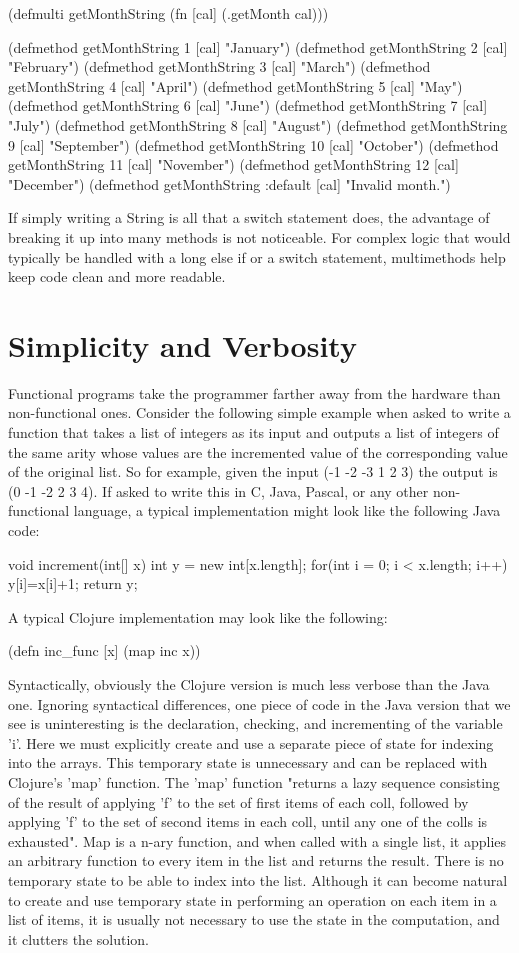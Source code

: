 (defmulti getMonthString (fn [cal] (.getMonth cal)))

(defmethod getMonthString 1 [cal] "January")
(defmethod getMonthString 2 [cal] "February")
(defmethod getMonthString 3 [cal] "March")
(defmethod getMonthString 4 [cal] "April")
(defmethod getMonthString 5 [cal] "May")
(defmethod getMonthString 6 [cal] "June")
(defmethod getMonthString 7 [cal] "July")
(defmethod getMonthString 8 [cal] "August")
(defmethod getMonthString 9 [cal] "September")
(defmethod getMonthString 10 [cal] "October")
(defmethod getMonthString 11 [cal] "November")
(defmethod getMonthString 12 [cal] "December")
(defmethod getMonthString :default [cal] "Invalid month.")

If simply writing a String is all that a switch statement does, the advantage of breaking it up into many
methods is not noticeable. For complex logic that would typically be handled with a long else if or a switch statement, 
multimethods help keep code clean and more readable.

\section{Simplicity and Verbosity}
Functional programs take the programmer farther away from the hardware than non-functional ones. Consider the following simple example when asked to write a function that takes a list of integers as its input and outputs a list of integers of the same arity whose values are the incremented value of the corresponding value of the original list. So for example, given the input (-1 -2 -3 1 2 3) the output is (0 -1 -2 2 3 4). If asked to write this in C, Java, Pascal, or any other non-functional language, a typical implementation might look like the following Java code: 

void increment(int[] x) {
	int y = new int[x.length];
	for(int i = 0; i < x.length; i++) { 
	  y[i]=x[i]+1;
         }
         return y;
}

A typical Clojure implementation may look like the following: 

(defn inc_func [x] (map inc x))

Syntactically, obviously the Clojure version is much less verbose than the Java one.
Ignoring syntactical differences, one piece of code in the Java version that we see is uninteresting is the declaration,
checking, and incrementing of the variable 'i'. Here we must explicitly create and use a separate piece of state for indexing into the arrays. This temporary state is unnecessary
and can be replaced with Clojure's 'map' function. The 'map' function "returns a lazy sequence consisting of the result of applying 'f' to the
set of first items of each coll, followed by applying 'f' to the set
of second items in each coll, until any one of the colls is
exhausted". Map is a n-ary function, and when called with a single list, it applies an arbitrary function to every item in the list and returns the result. There is no 
temporary state to be able to index into the list. Although it can become natural to create and use temporary state in performing an operation on each item in a list of items,
it is usually not necessary to use the state in the computation, and it clutters the solution. 


